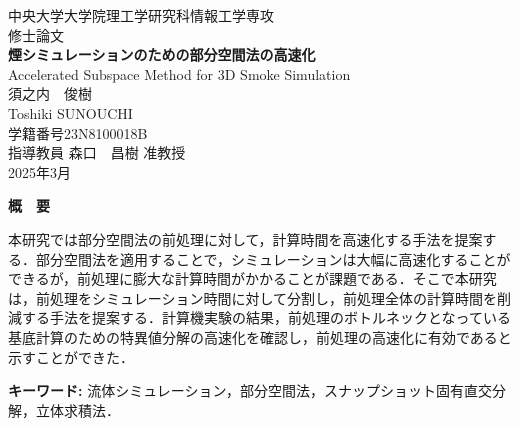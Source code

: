 \documentclass[a4j,12pt]{jreport}
\begin{document}
\thispagestyle{empty}
\begin{center}
\begin{Large}
\vspace*{0.7cm}
{\large 中央大学大学院理工学研究科情報工学専攻\\修士論文}\\
\vspace*{2.5cm}
{\LARGE\bf 煙シミュレーションのための部分空間法の高速化}\\
\vspace*{0.7cm}
{\sf Accelerated Subspace Method for 3D Smoke Simulation}\\
\vspace*{6.5cm}
須之内　俊樹\\
Toshiki SUNOUCHI\\
学籍番号\hspace*{1zw}23N8100018B\\
\vspace*{2.5cm}
指導教員\hspace*{1zw} 森口　昌樹 准教授\\
\vspace*{2.5cm}
2025年3月\\
\end{Large}
\end{center}


\newpage
\renewcommand{\baselinestretch}{1.25} \selectfont
{}


\begin{center} {\large \bf{概　要}} \end{center}
本研究では部分空間法の前処理に対して，計算時間を高速化する手法を提案する．部分空間法を適用することで，シミュレーションは大幅に高速化することができるが，前処理に膨大な計算時間がかかることが課題である．そこで本研究は，前処理をシミュレーション時間に対して分割し，前処理全体の計算時間を削減する手法を提案する．計算機実験の結果，前処理のボトルネックとなっている基底計算のための特異値分解の高速化を確認し，前処理の高速化に有効であると示すことができた．

\vspace{1zw} \noindent
{\bf キーワード: }流体シミュレーション，部分空間法，スナップショット固有直交分解，立体求積法．

\tableofcontents


\newpage
{}

\end{document}
